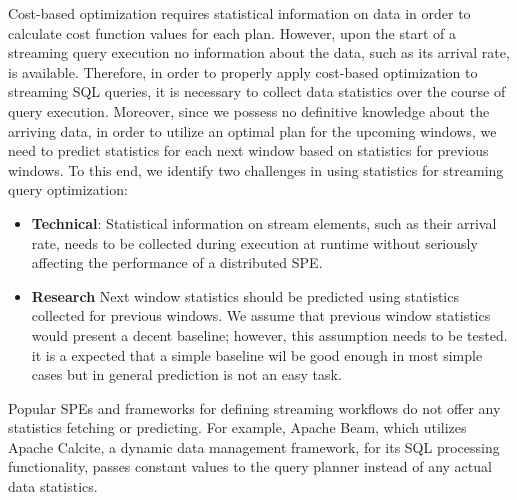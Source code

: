 Cost-based optimization requires statistical information on data in order to calculate cost function values for each plan. However, upon the start of a streaming query execution no information about the data, such as its arrival rate, is available. Therefore, in order to properly apply cost-based optimization to streaming SQL queries, it is necessary to collect data statistics over the course of query execution. Moreover, since we possess no definitive knowledge about the arriving data, in order to utilize an optimal plan for the upcoming windows, we need to predict statistics for each next window based on statistics for previous windows. To this end, we identify two challenges in using statistics for streaming query optimization:

\begin{itemize}
    \item \textbf{Technical}:
    Statistical information on stream elements, such as their arrival rate, needs to be collected during execution at runtime without seriously affecting the performance of a distributed SPE. %
    \item \textbf{Research}
    Next window statistics should be predicted using statistics collected for previous windows. We assume that previous window statistics would present a decent baseline; however, this assumption needs to be tested. it is a expected that a simple baseline wil be good enough in most simple cases but in general prediction is not an easy task.
\end{itemize}

Popular SPEs and frameworks for defining streaming workflows do not offer any statistics fetching or predicting. For example, Apache Beam, which utilizes Apache Calcite, a dynamic data management framework, for its SQL processing functionality, passes constant values to the query planner instead of any actual data statistics.

